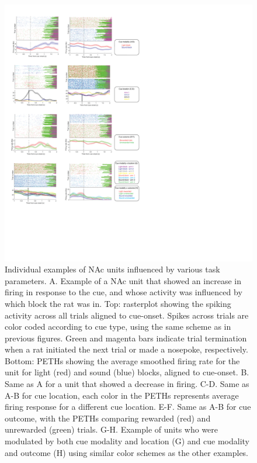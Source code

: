 \documentclass[11pt]{article}
\begin{document}
\begin{figure}[h]
\centering
\includegraphics[width=\textwidth]{Fig 5 - Neural examples.png}
\caption{Individual examples of NAc units influenced by various task parameters. A. Example of a NAc unit that showed an increase in firing in response to the cue, and whose activity was influenced by which block the rat was in. Top: rasterplot showing the spiking activity across all trials aligned to cue-onset. Spikes across trials are color coded according to cue type, using the same scheme as in previous figures. Green and magenta bars indicate trial termination when a rat initiated the next trial or made a nosepoke, respectively. Bottom: PETHs showing the average smoothed firing rate for the unit for light (red) and sound (blue) blocks, aligned to cue-onset. B. Same as A for a unit that showed a decrease in firing. C-D. Same as A-B for cue location, each color in the PETHs represents average firing response for a different cue location. E-F. Same as A-B for cue outcome, with the PETHs comparing rewarded (red) and unrewarded (green) trials. G-H. Example of units who were modulated by both cue modality and location (G) and cue modality and outcome (H) using similar color schemes as the other examples.}
\label{fig:examples}
\end{figure}
\end{document}
